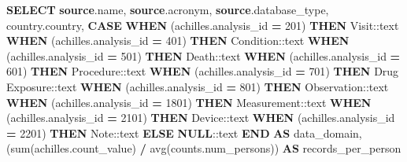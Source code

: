 \documentclass[
]{book}
\newenvironment{Shaded}{\begin{snugshade}}{\end{snugshade}}
\newcommand{\CharTok}[1]{\textcolor[rgb]{0.31,0.60,0.02}{#1}}
\newcommand{\ControlFlowTok}[1]{\textcolor[rgb]{0.13,0.29,0.53}{\textbf{#1}}}
\newcommand{\DecValTok}[1]{\textcolor[rgb]{0.00,0.00,0.81}{#1}}
\newcommand{\FunctionTok}[1]{\textcolor[rgb]{0.00,0.00,0.00}{#1}}
\newcommand{\KeywordTok}[1]{\textcolor[rgb]{0.13,0.29,0.53}{\textbf{#1}}}
\newcommand{\NormalTok}[1]{#1}
\newcommand{\OperatorTok}[1]{\textcolor[rgb]{0.81,0.36,0.00}{\textbf{#1}}}
\newcommand{\StringTok}[1]{\textcolor[rgb]{0.31,0.60,0.02}{#1}}
\begin{document}
\begin{Shaded}
\begin{Highlighting}[]
\KeywordTok{SELECT} \KeywordTok{source}\NormalTok{.name,}
   \KeywordTok{source}\NormalTok{.acronym,}
   \KeywordTok{source}\NormalTok{.database\_type,}
\NormalTok{   country.country,}
       \ControlFlowTok{CASE}
           \ControlFlowTok{WHEN}\NormalTok{ (achilles.analysis\_id }\OperatorTok{=} \DecValTok{201}\NormalTok{) }\ControlFlowTok{THEN} \StringTok{\textquotesingle{}Visit\textquotesingle{}}\NormalTok{:}\CharTok{:text}
           \ControlFlowTok{WHEN}\NormalTok{ (achilles.analysis\_id }\OperatorTok{=} \DecValTok{401}\NormalTok{) }\ControlFlowTok{THEN} \StringTok{\textquotesingle{}Condition\textquotesingle{}}\NormalTok{:}\CharTok{:text}
           \ControlFlowTok{WHEN}\NormalTok{ (achilles.analysis\_id }\OperatorTok{=} \DecValTok{501}\NormalTok{) }\ControlFlowTok{THEN} \StringTok{\textquotesingle{}Death\textquotesingle{}}\NormalTok{:}\CharTok{:text}
           \ControlFlowTok{WHEN}\NormalTok{ (achilles.analysis\_id }\OperatorTok{=} \DecValTok{601}\NormalTok{) }\ControlFlowTok{THEN} \StringTok{\textquotesingle{}Procedure\textquotesingle{}}\NormalTok{:}\CharTok{:text}
           \ControlFlowTok{WHEN}\NormalTok{ (achilles.analysis\_id }\OperatorTok{=} \DecValTok{701}\NormalTok{) }\ControlFlowTok{THEN} \StringTok{\textquotesingle{}Drug Exposure\textquotesingle{}}\NormalTok{:}\CharTok{:text}
           \ControlFlowTok{WHEN}\NormalTok{ (achilles.analysis\_id }\OperatorTok{=} \DecValTok{801}\NormalTok{) }\ControlFlowTok{THEN} \StringTok{\textquotesingle{}Observation\textquotesingle{}}\NormalTok{:}\CharTok{:text}
           \ControlFlowTok{WHEN}\NormalTok{ (achilles.analysis\_id }\OperatorTok{=} \DecValTok{1801}\NormalTok{) }\ControlFlowTok{THEN} \StringTok{\textquotesingle{}Measurement\textquotesingle{}}\NormalTok{:}\CharTok{:text}
           \ControlFlowTok{WHEN}\NormalTok{ (achilles.analysis\_id }\OperatorTok{=} \DecValTok{2101}\NormalTok{) }\ControlFlowTok{THEN} \StringTok{\textquotesingle{}Device\textquotesingle{}}\NormalTok{:}\CharTok{:text}
           \ControlFlowTok{WHEN}\NormalTok{ (achilles.analysis\_id }\OperatorTok{=} \DecValTok{2201}\NormalTok{) }\ControlFlowTok{THEN} \StringTok{\textquotesingle{}Note\textquotesingle{}}\NormalTok{:}\CharTok{:text}
           \ControlFlowTok{ELSE} \KeywordTok{NULL}\NormalTok{:}\CharTok{:text}
       \ControlFlowTok{END} \KeywordTok{AS}\NormalTok{ data\_domain,}
\NormalTok{   (}\FunctionTok{sum}\NormalTok{(achilles.count\_value) }\OperatorTok{/} \FunctionTok{avg}\NormalTok{(counts.num\_persons)) }\KeywordTok{AS}\NormalTok{ records\_per\_person}

\end{Highlighting}
\end{Shaded}
\end{document}
